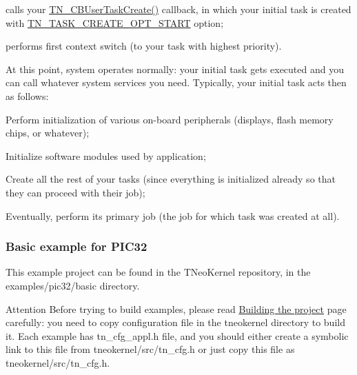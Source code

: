 \begin{DoxyItemize}
\begin{DoxyItemize}
\item calls your {\ttfamily \hyperlink{tn__sys_8h_a94f785ff88dfca8746f34de59784883d}{T\+N\+\_\+\+C\+B\+User\+Task\+Create()}} callback, in which your initial task is created with {\ttfamily \hyperlink{tn__tasks_8h_a8fa2ef577d6bd159b3fae559839f98d5a0c9352496e4465eb7e1b29dab7544acc}{T\+N\+\_\+\+T\+A\+S\+K\+\_\+\+C\+R\+E\+A\+T\+E\+\_\+\+O\+P\+T\+\_\+\+S\+T\+A\+R\+T}} option;
\item performs first context switch (to your task with highest priority).
\end{DoxyItemize}
\item At this point, system operates normally\+: your initial task gets executed and you can call whatever system services you need. Typically, your initial task acts then as follows\+:
\begin{DoxyItemize}
\item Perform initialization of various on-\/board peripherals (displays, flash memory chips, or whatever);
\item Initialize software modules used by application;
\item Create all the rest of your tasks (since everything is initialized already so that they can proceed with their job);
\item Eventually, perform its primary job (the job for which task was created at all).
\end{DoxyItemize}
\end{DoxyItemize}

\subsubsection*{Basic example for P\+I\+C32}

This example project can be found in the T\+Neo\+Kernel repository, in the {\ttfamily examples/pic32/basic} directory.

\begin{DoxyAttention}{Attention}
Before trying to build examples, please read \hyperlink{building}{Building the project} page carefully\+: you need to copy configuration file in the tneokernel directory to build it. Each example has {\ttfamily tn\+\_\+cfg\+\_\+appl.\+h} file, and you should either create a symbolic link to this file from {\ttfamily tneokernel/src/tn\+\_\+cfg.\+h} or just copy this file as {\ttfamily tneokernel/src/tn\+\_\+cfg.\+h}.
\end{DoxyAttention}

